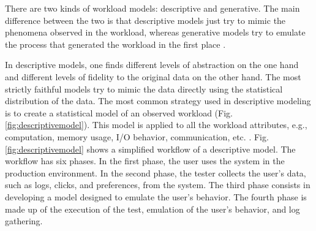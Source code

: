 \documentclass[times]{stvrauth}
\begin{document}
There are two kinds of workload models: descriptive and generative. The main difference between the two is that descriptive models just try to mimic the phenomena observed in the workload, whereas generative models try to emulate the process that generated the workload in the first place \cite{DiLucca2006}. 

In descriptive models, one finds different levels of abstraction on the one hand and different levels of fidelity to the original data on the other hand. The most strictly faithful models try to mimic the data directly using the statistical distribution of the data. The most common strategy used in descriptive modeling is to create a statistical model of an observed workload (Fig. \ref{fig:descriptivemodel}). This model is applied to all the workload attributes, e.g., computation, memory usage, I/O behavior, communication, etc. \cite{DiLucca2006}. Fig. \ref{fig:descriptivemodel} shows a simplified workflow of a descriptive model. The workflow has six phases. In the first phase, the user uses the system in the production environment. In the second phase, the tester collects the user's data, such as logs, clicks, and preferences, from the system. The third phase consists in developing a model designed to emulate the user's behavior. The fourth phase is made up of the execution of the test, emulation of the user's behavior, and log gathering.
\end{document}
